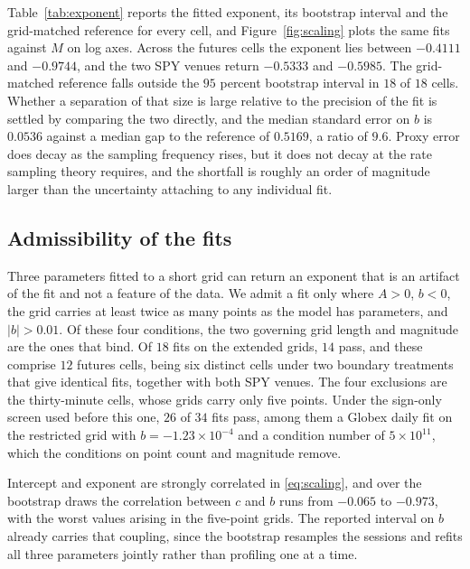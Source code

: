 Table~\ref{tab:exponent} reports the fitted exponent, its bootstrap interval and
the grid-matched reference for every cell, and Figure~\ref{fig:scaling} plots the
same fits against $M$ on log axes. Across the futures cells the exponent lies
between $-0.4111$ and $-0.9744$, and %
the two SPY venues return $-0.5333$ and $-0.5985$. The grid-matched reference %
falls outside the $95$ percent bootstrap interval in $18$ of $18$ cells. Whether %
a separation of that size is large relative to the precision of the fit is
settled by comparing the two directly, and the median standard error on $b$ is
$0.0536$ against a median gap to the reference of $0.5169$, a ratio of $9.6$. %
Proxy error does decay as the sampling frequency rises, but it does not decay at
the rate sampling theory requires, and the shortfall is roughly an order of
magnitude larger than the uncertainty attaching to any individual fit.

\subsection{Admissibility of the fits}

Three parameters fitted to a short grid can return an exponent that is an artifact
of the fit and not a feature of the data. We admit a fit only where $A > 0$,
$b < 0$, the grid carries at least twice as many points as the model has
parameters, and $|b| > 0.01$. Of these four conditions, the two governing grid
length and magnitude are the ones that bind. Of $18$ fits on the extended grids, %
$14$ pass, and these comprise $12$ futures cells, being six distinct cells under %
two boundary treatments that give identical fits, together with both SPY venues. %
The four exclusions are the thirty-minute cells, whose grids carry only five
points. Under the sign-only screen used before this one, $26$ of $34$ fits %
pass, among them a Globex daily fit on the restricted grid with
$b = -1.23 \times 10^{-4}$ and a condition number of $5 \times 10^{11}$, which
the conditions on point count and magnitude remove.

Intercept and exponent are strongly correlated in \eqref{eq:scaling}, and over
the bootstrap draws the correlation between $c$ and $b$ runs from $-0.065$ to %
$-0.973$, with the worst values arising in the five-point grids. The reported
interval on $b$ already carries that coupling, since the bootstrap resamples the
sessions and refits all three parameters jointly rather than profiling one at a
time.

